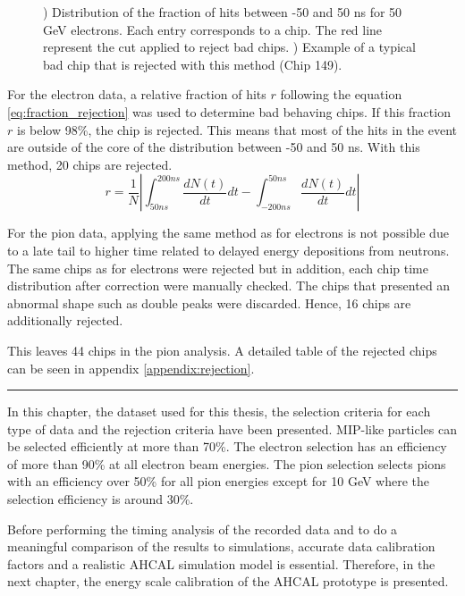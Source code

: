 \begin{figure}[htbp!]
\begin{subfigure}[t]{0.5\textwidth}
		\caption{} \label{fig:ExBadChip}
	\end{subfigure}
	\caption{) Distribution of the fraction of hits between -50 and 50 ns for 50 GeV electrons. Each entry corresponds to a chip. The red line represent the cut applied to reject bad chips. ) Example of a typical bad chip that is rejected with this method (Chip 149).}
\end{figure}

For the electron data, a relative fraction of hits $r$ following the equation \ref{eq:fraction_rejection} was used to determine bad behaving chips. If this fraction $r$ is below 98\%, the chip is rejected. This means that most of the hits in the event are outside of the core of the distribution between -50 and 50 ns. With this method, 20 chips are rejected.
\begin{equation} \label{eq:fraction_rejection}
	r = \frac{1}{N} \left|\int_{50 ns}^{200 ns} \frac{dN(t)}{dt} dt - \int_{-200 ns}^{50 ns} \frac{dN(t)}{dt} dt\right|
\end{equation}

For the pion data, applying the same method as for electrons is not possible due to a late tail to higher time related to delayed energy depositions from neutrons. The same chips as for electrons were rejected but in addition, each chip time distribution after correction were manually checked. The chips that presented an abnormal shape such as double peaks were discarded. Hence, 16 chips are additionally rejected.

This leaves 44 chips in the pion analysis. A detailed table of the rejected chips can be seen in appendix \ref{appendix:rejection}.

\newpage
\begin{center}
  \rule{0.5\textwidth}{.4pt}
\end{center}

In this chapter, the dataset used for this thesis, the selection criteria for each type of data and the rejection criteria have been presented. MIP-like particles can be selected efficiently at more than 70\%. The electron selection has an efficiency of more than 90\% at all electron beam energies. The pion selection selects pions with an efficiency over 50\% for all pion energies except for 10 GeV where the selection efficiency is around 30\%.

Before performing the timing analysis of the recorded data and to do a meaningful comparison of the results to simulations, accurate data calibration factors and a realistic AHCAL simulation model is essential. Therefore, in the next chapter, the energy scale calibration of the AHCAL prototype is presented.
